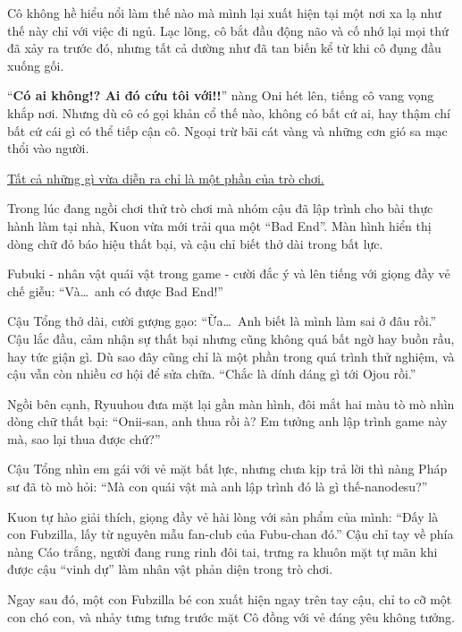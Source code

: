 \documentclass[../main.tex]{subfiles}
\begin{document}
Cô không hề hiểu nổi làm thế nào mà mình lại xuất hiện tại một nơi xa lạ như thế này chỉ với việc đi ngủ. Lạc lõng, cô bắt đầu động não và cố nhớ lại mọi thứ đã xảy ra trước đó, nhưng tất cả dường như đã tan biến kể từ khi cô đụng đầu xuống gối.

``\textbf{Có ai không!? Ai đó cứu tôi với!!}'' nàng Oni hét lên, tiếng cô vang vọng khắp nơi. Nhưng dù cô có gọi khản cổ thế nào, không có bất cứ ai, hay thậm chí bất cứ cái gì có thể tiếp cận cô. Ngoại trừ bãi cát vàng và những cơn gió sa mạc thổi vào người.

\omk

\begin{center}
  \uline{Tất cả những gì vừa diễn ra chỉ là một phần của trò chơi.}
\end{center}

Trong lúc đang ngồi chơi thử trò chơi mà nhóm cậu đã lập trình cho bài thực hành làm tại nhà, Kuon vừa mới trải qua một ``Bad End''. Màn hình hiển thị dòng chữ đỏ báo hiệu thất bại, và cậu chỉ biết thở dài trong bất lực.

Fubuki - nhân vật quái vật trong game - cười đắc ý và lên tiếng với giọng đầy vẻ chế giễu: ``Và\dots\ anh có được Bad End!''

Cậu Tổng thở dài, cười gượng gạo: ``Ừa\dots\ Anh biết là mình làm sai ở đâu rồi.'' Cậu lắc đầu, cảm nhận sự thất bại nhưng cũng không quá bất ngờ hay buồn rầu, hay tức giận gì. Dù sao đây cũng chỉ là một phần trong quá trình thử nghiệm, và cậu vẫn còn nhiều cơ hội để sửa chữa. ``Chắc là dính dáng gì tới Ojou rồi.''

Ngồi bên cạnh, Ryuuhou đưa mặt lại gần màn hình, đôi mắt hai màu tò mò nhìn dòng chữ thất bại: ``Onii-san, anh thua rồi à? Em tưởng anh lập trình game này mà, sao lại thua được chứ?''

Cậu Tổng nhìn em gái với vẻ mặt bất lực, nhưng chưa kịp trả lời thì nàng Pháp sư đã tò mò hỏi: ``Mà con quái vật mà anh lập trình đó là gì thế-nanodesu?''

Kuon tự hào giải thích, giọng đầy vẻ hài lòng với sản phẩm của mình: ``Đấy là con Fubzilla, lấy từ nguyên mẫu fan-club của Fubu-chan đó.'' Cậu chỉ tay về phía nàng Cáo trắng, người đang rung rinh đôi tai, trưng ra khuôn mặt tự mãn khi được cậu ``vinh dự'' làm nhân vật phản diện trong trò chơi.

Ngay sau đó, một con Fubzilla bé con xuất hiện ngay trên tay cậu, chỉ to cỡ một con chó con, và nhảy tưng tưng trước mặt Cô đồng với vẻ đáng yêu không tưởng.
\end{document}
